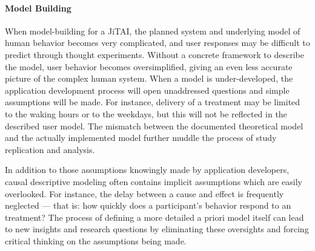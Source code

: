 \documentclass[runningheads,a4paper]{llncs}
\begin{document}
\paragraph{Model Building}
When model-building for a JiTAI, the planned system and underlying model of human behavior becomes very complicated, and user responses may be difficult to predict through thought experiments.
Without a concrete framework to describe the model, user behavior becomes oversimplified, giving an even less accurate picture of the complex human system.
When a model is under-developed, the application development process will open unaddressed questions and simple assumptions will be made.
For instance, delivery of a treatment may be limited to the waking hours or to the weekdays, but this will not be reflected in the described user model.
The mismatch between the documented theoretical model and the actually implemented model further muddle the process of study replication and analysis.

In addition to those assumptions knowingly made by application developers, causal descriptive modeling often contains implicit assumptions which are easily overlooked.
For instance, the delay between a cause and effect is frequently neglected --- that is: how quickly does a participant's behavior respond to an treatment?
The process of defining a more detailed a priori model itself can lead to new insights and research questions by eliminating these oversights and forcing critical thinking on the assumptions being made.

\end{document}
